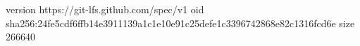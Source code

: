 version https://git-lfs.github.com/spec/v1
oid sha256:24fe5cdf6ffb14e3911139a1c1e10e91c25defe1c3396742868e82c1316fcd6e
size 266640
